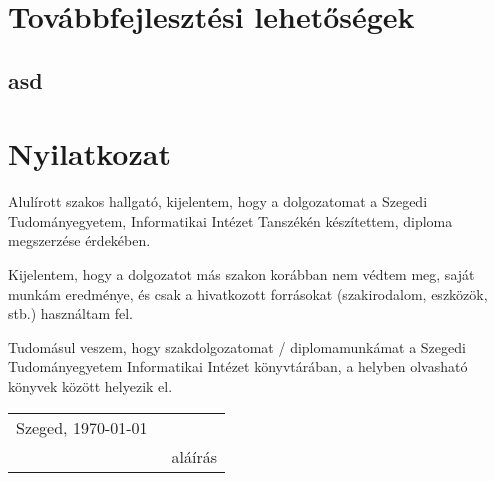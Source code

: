 \documentclass[12pt]{report}
\theoremstyle{definition}
\begin{document}
\chapter{Továbbfejlesztési lehetőségek}
\section{asd}



\chapter*{Nyilatkozat}




\noindent
Alulírott \makebox[4cm]{\dotfill} szakos hallgató, kijelentem, hogy a dolgozatomat a Szegedi Tudományegyetem, Informatikai Intézet \makebox[4cm]{\dotfill} Tanszékén készítettem, \makebox[4cm]{\dotfill} diploma megszerzése érdekében.

Kijelentem, hogy a dolgozatot más szakon korábban nem védtem meg, saját munkám eredménye, és csak a hivatkozott forrásokat (szakirodalom, eszközök, stb.) használtam fel.

Tudomásul veszem, hogy szakdolgozatomat / diplomamunkámat a Szegedi Tudományegyetem Informatikai Intézet könyvtárában, a helyben olvasható könyvek között helyezik el.

\vspace*{2cm}

\begin{tabular}{lc}
	Szeged, \today\
	\hspace{2cm} & \makebox[6cm]{\dotfill} \\
	             & aláírás                 \\
\end{tabular}


\vspace*{4cm}
\end{document}
